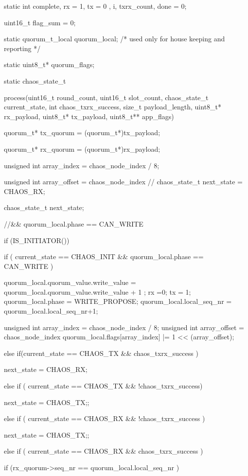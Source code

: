 static int complete, rx = 1, tx = 0 , i, txrx_count, done = 0;

uint16_t flag_sum = 0;

static quorum_t_local quorum_local; /* used only for house keeping and reporting */

static uint8_t* quorum_flags;

static chaos_state_t




process(uint16_t round_count, uint16_t slot_count, chaos_state_t current_state, int chaos_txrx_success, size_t payload_length, uint8_t* rx_payload, uint8_t* tx_payload, uint8_t** app_flags)

{

  quorum_t* tx_quorum = (quorum_t*)tx_payload;

  quorum_t* rx_quorum = (quorum_t*)rx_payload;

  unsigned int array_index = chaos_node_index / 8;

  unsigned int array_offset = chaos_node_index %
// chaos_state_t next_state = CHAOS_RX;

   chaos_state_t next_state;

//&& quorum_local.phase == CAN_WRITE

    if (IS_INITIATOR()){
    if ( current_state == CHAOS_INIT && quorum_local.phase == CAN_WRITE ){
    
     quorum_local.quorum_value.write_value = quorum_local.quorum_value.write_value + 1 ;
     rx =0;
     tx = 1;
     quorum_local.phase = WRITE_PROPOSE;
     quorum_local.local_seq_nr = quorum_local.local_seq_nr+1;

     unsigned int array_index = chaos_node_index / 8;
     unsigned int array_offset = chaos_node_index %
     quorum_local.flags[array_index] |= 1 << (array_offset);

        }

    else if(current_state == CHAOS_TX && chaos_txrx_success ){

        next_state = CHAOS_RX;
        }
    else if ( current_state == CHAOS_TX && !chaos_txrx_success){
        next_state = CHAOS_TX;;

        }
        else if ( current_state == CHAOS_RX && !chaos_txrx_success ){
        
        
        next_state = CHAOS_TX;;
        }
        
      else if ( current_state == CHAOS_RX && chaos_txrx_success ){
      
            if (rx_quorum->seq_nr == quorum_local.local_seq_nr ){
            
}}}}

